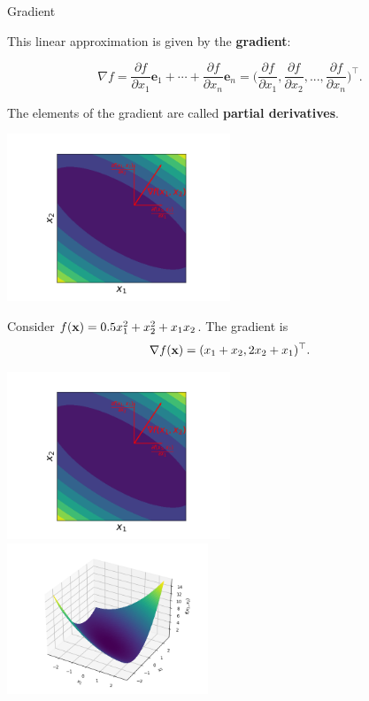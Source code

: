 \begin{vbframe}{Gradient}

This linear approximation is given by the \textbf{gradient}: %

\vspace*{-0.3cm}

$$
\nabla f = \frac{\partial f}{\partial x_1} \bm e_1 + \cdots + \frac{\partial f}{\partial x_n} \bm e_n =
  \biggl(\frac{\partial f}{\partial x_1}, \frac{\partial f}{\partial x_2}, ..., \frac{\partial f}{\partial x_n}\biggr)^{\top}.
$$

The elements of the gradient are called \textbf{partial derivatives}. 

\begin{center}
	\includegraphics[width = 0.5\textwidth]{figure_man/grad_unit_vectors.png} \\
\end{center}


\framebreak

Consider $f(\mathbf{x}) = 0.5 x_1^2 + x_2^2 + x_1 x_2$. The gradient is $$\nabla f(\mathbf{x}) = (x_1 + x_2, 2x_2 + x_1)^{\top}.$$

\begin{center}
	\includegraphics[width = 0.5\textwidth]{figure_man/grad_unit_vectors.png} ~~~ \includegraphics[width = 0.45\textwidth]{figure_man/gradient2.png}
\end{center}


\end{vbframe}

